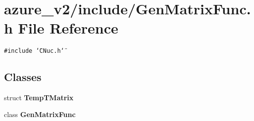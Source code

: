 \section{azure\_\-v2/include/Gen\-Matrix\-Func.h File Reference}
\label{GenMatrixFunc_8h}
{\tt \#include \char`\"{}CNuc.h\char`\"{}}\par
\subsection*{Classes}
\begin{CompactItemize}
\item 
struct \bf{Temp\-TMatrix}
\item 
class \bf{Gen\-Matrix\-Func}
\end{CompactItemize}
